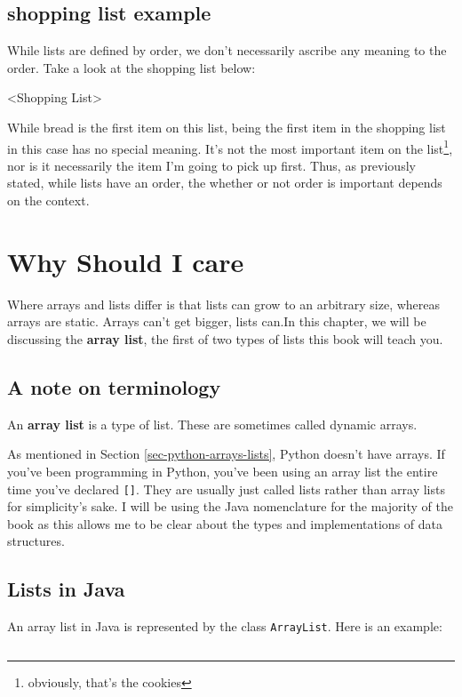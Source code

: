 \subsection*{shopping list example}
While lists are defined by order, we don't necessarily ascribe any meaning to the order.
Take a look at the shopping list below:


<Shopping List>

While bread is the first item on this list, being the first item in the shopping list in this case has no special meaning.  It's not the most important item on the list\footnote{obviously, that's the cookies}, nor is it necessarily the item I'm going to pick up first.  Thus, as previously stated, while lists have an order, the whether or not order is important depends on the context.

\section{Why Should I care}

Where arrays and lists differ is that lists can grow to an arbitrary size, whereas arrays are static.  Arrays can't get bigger, lists can.In this chapter, we will be discussing the \textbf{array list}, the first of two types of lists this book will teach you.

\subsection*{A note on terminology}
An \textbf{array list} is a type of list.  These are sometimes called dynamic arrays.

As mentioned in Section \ref{sec-python-arrays-lists}, Python doesn't have arrays.  If you've been programming in Python, you've been using an array list the entire time you've declared \texttt{[]}.  They are usually just called lists rather than array lists for simplicity's sake.
I will be using the Java nomenclature for the majority of the book as this allows me to be clear about the types and implementations of data structures.

\subsection{Lists in Java}

An array list in Java is represented by the class \texttt{ArrayList}.  Here is an example:

\begin{verbatim}

\end{verbatim}

